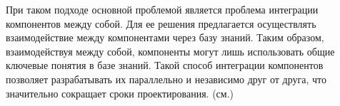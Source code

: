 При таком подходе основной проблемой является проблема интеграции компонентов между
собой. Для ее решения предлагается осуществлять взаимодействие между компонентами
через базу знаний. Таким образом, взаимодействуя между собой, компоненты могут лишь
использовать общие ключевые понятия в базе знаний. Такой способ интеграции
компонентов позволяет разрабатывать их параллельно и независимо друг от друга, что
значительно сокращает сроки проектирования. (см.)

%